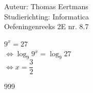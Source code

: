 \documentclass[a4paper]{article}
\begin{document}
  
\noindent \large Auteur: Thomas Eertmans \\
\noindent \large Studierichting: Informatica\\
\noindent \large Oefeningenreeks 2E nr. 8.7\\

\medskip

\normalsize

$9^x = 27$ \\

$\Leftrightarrow \log_{9}9^x = \log_{9}27$ \\

$\Leftrightarrow x = \dfrac{3}{2}$

\begin{thebibliography}{999}
\end{thebibliography}
\end{document}
